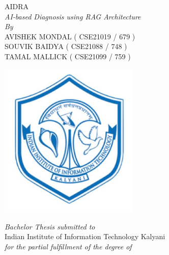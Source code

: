 \documentclass[12pt,a4paper]{report}
\newcommand{\mytitle}{AIDRA: AI-based Diagnosis using RAG Architecture}
\newcommand{\mySpace}{0.5cm}
\newcommand{\mySpaceHalf}{0.5cm}
\begin{document}
\clearpage
	\begin{titlepage}

    \centering

{\Huge  \textmd{ AIDRA \\[0.5cm] \textit{AI-based Diagnosis using RAG Architecture}} \fontsize{24}{28.8}\selectfont 
{}\selectfont}\\




    
\vspace{\mySpace}
    \large \textit{By}\\
\vspace{\mySpace}
    {\Large AVISHEK MONDAL ( CSE21019 / 679 )  \\
    \vspace{0.11cm}
    SOUVIK BAIDYA ( CSE21088  / 748 )\\
    \vspace{0.11cm}
    TAMAL MALLICK ( CSE21099 / 759 ) \\
    \fontsize{18}{22}\selectfont {}\selectfont
\vspace{\mySpace}}
    \begin{center}
        \includegraphics[width=0.5\textwidth]{iiitk_logo} %
    \end{center}
    {\Large \textit{Bachelor Thesis submitted to}\\
    \vspace{\mySpaceHalf}
    Indian Institute of Information Technology Kalyani \\ \vspace{\mySpaceHalf}
	 \textit{for the partial fulfillment of the degree of}\\ \vspace{\mySpaceHalf}

}
\end{titlepage}
\end{document}
